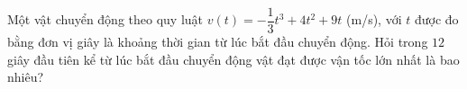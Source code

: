 \begin{bt}%
	Một vật chuyển động theo  quy luật $v(t)=-\dfrac{1}{3}t^3+4t^2+9t$ (m/s), với $t$ được đo bằng đơn vị giây là khoảng thời gian từ lúc bắt đầu chuyển động. Hỏi trong $12$ giây đầu tiên kể từ lúc bắt đầu chuyển động vật đạt được vận tốc lớn nhất là bao nhiêu?
\end{bt}

